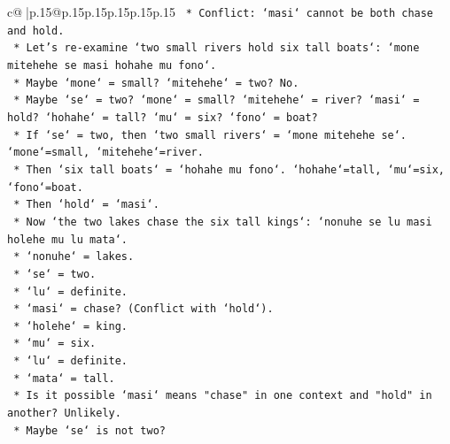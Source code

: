 \documentclass{article}
\begin{document}
{\begin{supertabular}{c@{$\;$}|p{.15\linewidth}@{}p{.15\linewidth}p{.15\linewidth}p{.15\linewidth}p{.15\linewidth}p{.15\linewidth}}
{{{\texttt{                                        *   Conflict: `masi` cannot be both chase and hold.} \\
\texttt{                                        *   Let's re{-}examine `two small rivers hold six tall boats`: `mone mitehehe se masi hohahe mu fono`.} \\
\texttt{                                            *   Maybe `mone` = small? `mitehehe` = two? No.} \\
\texttt{                                            *   Maybe `se` = two? `mone` = small? `mitehehe` = river? `masi` = hold? `hohahe` = tall? `mu` = six? `fono` = boat?} \\
\texttt{                                            *   If `se` = two, then `two small rivers` = `mone mitehehe se`. `mone`=small, `mitehehe`=river.} \\
\texttt{                                            *   Then `six tall boats` = `hohahe mu fono`. `hohahe`=tall, `mu`=six, `fono`=boat.} \\
\texttt{                                            *   Then `hold` = `masi`.} \\
\texttt{                                            *   Now `the two lakes chase the six tall kings`: `nonuhe se lu masi holehe mu lu mata`.} \\
\texttt{                                                *   `nonuhe` = lakes.} \\
\texttt{                                                *   `se` = two.} \\
\texttt{                                                *   `lu` = definite.} \\
\texttt{                                                *   `masi` = chase? (Conflict with `hold`).} \\
\texttt{                                                *   `holehe` = king.} \\
\texttt{                                                *   `mu` = six.} \\
\texttt{                                                *   `lu` = definite.} \\
\texttt{                                                *   `mata` = tall.} \\
\texttt{                                            *   Is it possible `masi` means "chase" in one context and "hold" in another? Unlikely.} \\
\texttt{                                            *   Maybe `se` is not two?} \\
}}}
\end{supertabular}}
\end{document}
